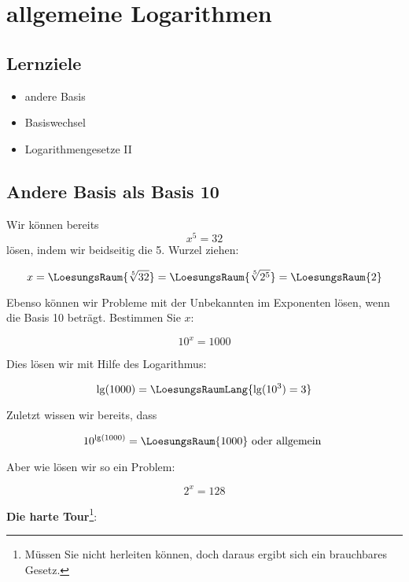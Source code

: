 
\section{allgemeine Logarithmen}
\subsection*{Lernziele}

\begin{itemize}
 \item andere Basis
 \item Basiswechsel
 \item Logarithmengesetze II
\end{itemize}
\newpage

\subsection{Andere Basis als Basis 10}

Wir können bereits $$x^5=32$$ lösen, indem wir beidseitig die
5. Wurzel ziehen:

$$x = \LoesungsRaum{\sqrt[5]{32}} = \LoesungsRaum{\sqrt[5]{2^5}} = \LoesungsRaum{2}$$

Ebenso können wir Probleme mit der Unbekannten im Exponenten lösen,
wenn die Basis 10 beträgt. Bestimmen Sie $x$:

$$10^x = 1000$$

Dies lösen wir mit Hilfe des Logarithmus:

$$\lg(1000) = \LoesungsRaumLang{\lg(10^3) = 3}$$

Zuletzt wissen wir bereits, dass

$$10^{\lg(1000)} = \LoesungsRaum{1000} \textrm{ oder allgemein }$$

\begin{center}
\end{center}

\newpage


Aber wie lösen wir so ein Problem:

$$2^x = 128$$

\textbf{Die harte Tour}\label{harteTourLogarithmen}\footnote{Müssen Sie nicht herleiten können,
  doch daraus ergibt sich ein brauchbares Gesetz.}:\\

